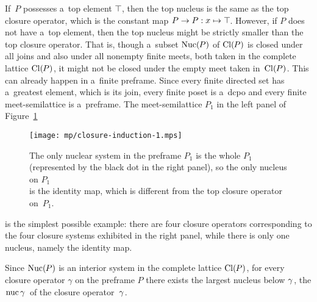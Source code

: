 \documentclass[11pt,letterpaper]{article}
\renewcommand{\thmskip}{\bigskip}
\begin{document}
\thmskip

If~$P$ possesses a~top element $\top\mspace{-1mu}$,
then the top nucleus is the same as the top closure operator,
which is the constant map $P\to P : x\mapsto\top\mspace{-1mu}$.
However, if $P$ does not have a~top element,
then the top nucleus might be strictly smaller than the top closure operator.
That is, though a~subset $\mathop{\smash{\mathrm{Nuc}}}\nolimits(\mspace{-1mu} P)$ of $\mathop{\smash{\mathrm{Cl}}}\nolimits(\mspace{-1mu} P)$ is closed under all joins
	and also under all nonempty finite meets,
		both taken in the complete lattice $\mathop{\smash{\mathrm{Cl}}}\nolimits(\mspace{-1mu} P)\mspace{1mu}$,
it might not be closed under the empty meet taken in~$\mathop{\smash{\mathrm{Cl}}}\nolimits(\mspace{-1mu} P)\mspace{1mu}$.
This can already happen in a~finite preframe.
Since every finite directed set has a~greatest element, which is its join,
every finite poset is a~dcpo and every finite meet-semilattice is a~preframe.
The meet-semilattice $P_1$ in the left panel of Figure~\ref{fig:P1-preframe-with-topnuc<topcl}
%
\begin{figure}[!htp]\centering
\vspace{1.5ex}
\texttt{[image: mp/closure-induction-1.mps]}
\vspace{1ex}
\captionsetup{margin=2em}
\caption{The only nuclear system in the preframe $P_1$ is the whole $P_1$\\
	(represented by the black dot in the right panel),
	so the only nucleus on $P_1$\\ is the identity map,
	which is different from the top closure operator on~$P_1$.}
\label{fig:P1-preframe-with-topnuc<topcl}
\vspace{-1ex}
\end{figure}
%
is the simplest possible example:
there are four closure operators corresponding
	to the four closure systems exhibited in the right panel,
while there is only one nucleus, namely the identity map.

\txtskip

Since $\mathop{\smash{\mathrm{Nuc}}}\nolimits(\mspace{-1mu} P)$ is an interior system in the complete lattice $\mathop{\smash{\mathrm{Cl}}}\nolimits(\mspace{-1mu} P)$,
for every closure operator $\gamma$ on the preframe $P$
there exists the largest nucleus below $\gamma\mspace{1mu}$,
the  $\mspace{2mu}\mathop{\smash{\mathrm{nuc}}}\nolimits\gamma\mspace{2mu}$ of the closure operator~$\gamma\mspace{1mu}$.

\txtskip
\end{document}

